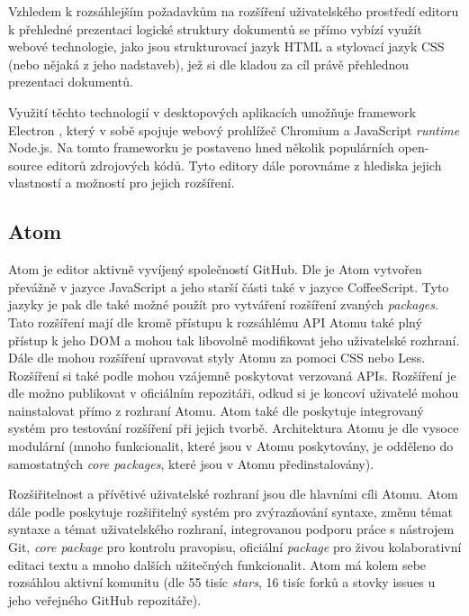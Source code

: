 Vzhledem k rozsáhlejším požadavkům na rozšíření uživatelského prostředí editoru k přehledné prezentaci logické struktury
dokumentů se přímo vybízí využít webové technologie, jako jsou strukturovací jazyk HTML a stylovací jazyk CSS (nebo
nějaká z jeho nadstaveb), jež si dle \cite{w3-html-css} kladou za cíl právě přehlednou prezentaci dokumentů.

Využití těchto technologií v desktopových aplikacích umožňuje framework Electron \cite{electron-docs}, který v sobě
spojuje webový prohlížeč Chromium a JavaScript \textit{runtime} Node.js. Na tomto frameworku je postaveno hned několik
populárních open-source editorů zdrojových kódů. Tyto editory dále porovnáme z hlediska jejich vlastností a možností pro
jejich rozšíření.

\subsection{Atom}

Atom je editor aktivně vyvíjený společností GitHub. Dle \cite{atom-docs} je Atom vytvořen převážně v jazyce
JavaScript a jeho starší části také v jazyce CoffeeScript. Tyto jazyky je pak dle \cite{atom-docs} také možné použít pro
vytváření rozšíření zvaných \textit{packages}. Tato rozšíření mají dle \cite{atom-docs} kromě přístupu k rozsáhlému API
Atomu také plný přístup k jeho DOM a mohou tak libovolně modifikovat jeho uživatelské rozhraní. Dále dle \cite
{atom-docs} mohou rozšíření upravovat styly Atomu za pomoci CSS nebo Less. Rozšíření si také podle \cite{atom-docs}
mohou vzájemně poskytovat verzovaná APIs. Rozšíření je dle \cite{atom-docs} možno publikovat v oficiálním repozitáři,
odkud si je koncoví uživatelé mohou nainstalovat přímo z rozhraní Atomu. Atom také dle \cite{atom-docs} poskytuje
integrovaný systém pro testování rozšíření při jejich tvorbě. Architektura Atomu je dle \cite{atom-docs} vysoce
modulární (mnoho funkcionalit, které jsou v Atomu poskytovány, je odděleno do samostatných \textit{core packages},
které jsou v Atomu předinstalovány).

Rozšiřitelnost a přívětivé uživatelské rozhraní jsou dle \cite{atom-docs} hlavními cíli Atomu. Atom dále podle \cite
{atom-docs} poskytuje rozšiřitelný systém pro zvýrazňování syntaxe, změnu témat syntaxe a témat uživatelského rozhraní,
integrovanou podporu práce s nástrojem Git, \textit{core package} pro kontrolu pravopisu, oficiální \textit{package} pro
živou kolaborativní editaci textu a mnoho dalších užitečných funkcionalit. Atom má kolem sebe rozsáhlou aktivní komunitu
(dle \cite{atom-github} 55 tisíc \textit{stars}, 16 tisíc forků a stovky issues u jeho veřejného GitHub repozitáře).


